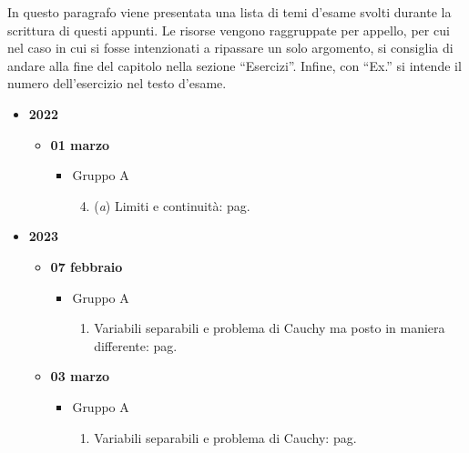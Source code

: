\documentclass[a4paper]{article}
\newcommand{\dquotes}[1]{``#1''}
\begin{document}
	In questo paragrafo viene presentata una lista di temi d'esame svolti durante la scrittura di questi appunti. Le risorse vengono raggruppate per appello, per cui nel caso in cui si fosse intenzionati a ripassare un solo argomento, si consiglia di andare alla fine del capitolo nella sezione \dquotes{Esercizi}. Infine, con \dquotes{Ex.} si intende il numero dell'esercizio nel testo d'esame.
	\begin{itemize}
		\item \textbf{2022}
		\begin{itemize}
			\item \textbf{01 marzo}
			\begin{itemize}
				\item Gruppo A
				\begin{enumerate}[label*=Ex. \arabic*), leftmargin = 4em]
					\setcounter{enumi}{3}
					\item (\emph{a}) Limiti e continuità: pag.~\hyperlink{
						exam: esame 01 marzo 2022 - Gruppo A - 4 esercizio (a)
					}{
					}
				\end{enumerate}
			\end{itemize}
		\end{itemize}

		\item \textbf{2023}
		\begin{itemize}
			\item \textbf{07 febbraio}
			\begin{itemize}
				\item Gruppo A
				\begin{enumerate}[label*=Ex. \arabic*), leftmargin = 4em]
					\item Variabili separabili e problema di Cauchy ma posto in maniera differente: pag.~\hyperlink{
						exam: esame 07 febbraio 2023 - Gruppo A - 1 esercizio
					}{
					}
				\end{enumerate}
			\end{itemize}

			\item \textbf{03 marzo}
			\begin{itemize}
				\item Gruppo A
				\begin{enumerate}[label*=Ex. \arabic*), leftmargin = 4em]
					\item Variabili separabili e problema di Cauchy: pag.~\hyperlink{
						exam: esame 03 marzo 2023 - Gruppo A - 1 esercizio
					}{
					}


\end{enumerate}
\end{itemize}
\end{itemize}
\end{itemize}
\end{document}
